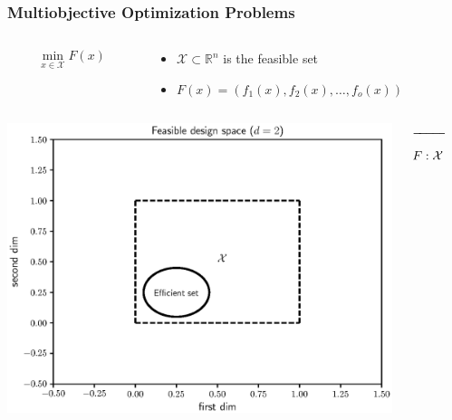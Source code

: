 \documentclass[aspectratio=169]{beamer}
\begin{document}
\begin{frame}\frametitle{Multiobjective Optimization Problems}
\begin{columns}
\begin{column}{0.5\textwidth}
{\Large
$$
\min_{x \in \mathcal{X}} F(x)
$$
}

\end{column}
\begin{column}{0.5\textwidth}
\begin{itemize}
\item $\mathcal{X} \subset \mathbb{R}^n$ is the feasible set
\item $F(x) = (f_1(x), f_2(x), \ldots, f_o(x))$
\end{itemize}
\end{column}
\end{columns}
\bigskip
\begin{columns}
\begin{column}{.35\textwidth}
\includegraphics[width=\textwidth]{feasible_design.eps}
\end{column}
\begin{column}{.2\textwidth}
\begin{center}
$\xrightarrow{\hspace*{2cm}}$
$$
F : {\cal X} \rightarrow {\cal Y}
$$
\end{center}
\end{column}
\begin{column}{.35\textwidth}

\end{column}
\end{columns}
\end{frame}
\end{document}
